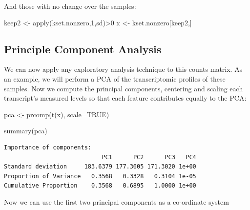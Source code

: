 \documentclass[
  letterpaper,
  DIV=11,
  numbers=noendperiod]{scrartcl}
\newenvironment{Shaded}{\begin{snugshade}}{\end{snugshade}}
\newcommand{\AttributeTok}[1]{\textcolor[rgb]{0.40,0.45,0.13}{#1}}
\newcommand{\ConstantTok}[1]{\textcolor[rgb]{0.56,0.35,0.01}{#1}}
\newcommand{\DecValTok}[1]{\textcolor[rgb]{0.68,0.00,0.00}{#1}}
\newcommand{\FunctionTok}[1]{\textcolor[rgb]{0.28,0.35,0.67}{#1}}
\newcommand{\NormalTok}[1]{\textcolor[rgb]{0.00,0.23,0.31}{#1}}
\newcommand{\OtherTok}[1]{\textcolor[rgb]{0.00,0.23,0.31}{#1}}
\newcommand{\SpecialCharTok}[1]{\textcolor[rgb]{0.37,0.37,0.37}{#1}}
\newcommand{\StringTok}[1]{\textcolor[rgb]{0.13,0.47,0.30}{#1}}
\begin{document}
And those with no change over the samples:

\begin{Shaded}
\begin{Highlighting}[]
\NormalTok{keep2 }\OtherTok{\textless{}{-}} \FunctionTok{apply}\NormalTok{(kset.nonzero,}\DecValTok{1}\NormalTok{,sd)}\SpecialCharTok{\textgreater{}}\DecValTok{0}
\NormalTok{x }\OtherTok{\textless{}{-}}\NormalTok{ kset.nonzero[keep2,]}
\end{Highlighting}
\end{Shaded}

\hypertarget{principle-component-analysis}{%
\subsection{Principle Component
Analysis}\label{principle-component-analysis}}

We can now apply any exploratory analysis technique to this counts
matrix. As an example, we will perform a PCA of the transcriptomic
profiles of these samples. Now we compute the principal components,
centering and scaling each transcript's measured levels so that each
feature contributes equally to the PCA:

\begin{Shaded}
\begin{Highlighting}[]
\NormalTok{pca }\OtherTok{\textless{}{-}} \FunctionTok{prcomp}\NormalTok{(}\FunctionTok{t}\NormalTok{(x), }\AttributeTok{scale=}\ConstantTok{TRUE}\NormalTok{)}

\FunctionTok{summary}\NormalTok{(pca)}
\end{Highlighting}
\end{Shaded}

\begin{verbatim}
Importance of components:
                            PC1      PC2      PC3   PC4
Standard deviation     183.6379 177.3605 171.3020 1e+00
Proportion of Variance   0.3568   0.3328   0.3104 1e-05
Cumulative Proportion    0.3568   0.6895   1.0000 1e+00
\end{verbatim}

Now we can use the first two principal components as a co-ordinate
system

\begin{Shaded}
\end{Shaded}
\end{document}
